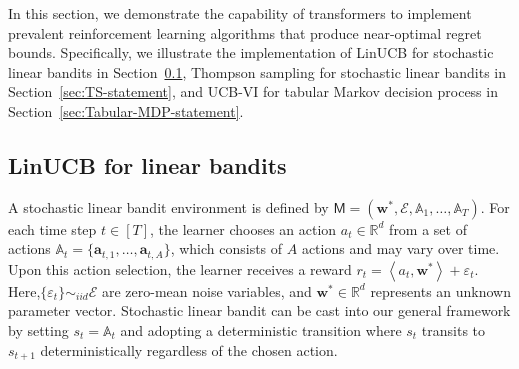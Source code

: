 \documentclass[10pt]{article}
\newcommand{\eps}{\varepsilon}
\renewcommand{\cO}{\mathcal{O}}
\newcommand{\<}{\left\langle}
\renewcommand{\>}{\right\rangle}
\newcommand{\R}{\mathbb{R}}
\newcommand{\inst}{{\mathsf{M}}}
\newcommand{\tcO}{{\tilde{\mathcal O}}}
\newcommand{\state}{{s}}
\newcommand{\action}{{a}}
\newcommand{\reward}{{r}}
\newcommand{\totlen}{{T}} %
\newcommand{\prior}{{\Lambda}}
\newcommand{\aset}{{\sA}}
\newcommand{\TrueLBPar}{{\bw^*}}
\newcommand{\Noise}{{\eps}}
\newcommand{\Noisedist}{{\mathcal{E}}}
\newcommand{\Numact}{{A}}
\newcommand{\conO}{{\mathrm{O}}}
\def\sA{{\mathbb{A}}}
\def\ba{{\mathbf a}}
\def\bw{{\mathbf w}}
\begin{document}
In this section, we demonstrate the capability of transformers to implement prevalent reinforcement learning algorithms that produce near-optimal regret bounds. Specifically, we illustrate the implementation of LinUCB for stochastic linear bandits in Section~\ref{sec:LinUCB-statement}, Thompson sampling for stochastic linear bandits in Section~\ref{sec:TS-statement}, and UCB-VI for tabular Markov decision process in Section~\ref{sec:Tabular-MDP-statement}. %

\subsection{LinUCB for linear bandits}\label{sec:LinUCB-statement}

A stochastic linear bandit environment is defined by $\inst=(\TrueLBPar,\Noisedist,\aset_1,\ldots,\aset_\totlen)$. For each time step $t\in[\totlen]$, the learner chooses an action $\action_t\in\R^{d}$ from a set of actions $\sA_t=\{\ba_{t,1},\ldots,\ba_{t,\Numact}\}$, which consists of $\Numact$ actions and may vary over time. Upon this action selection, the learner receives a reward $\reward_t=\<\action_t,\TrueLBPar\>+\Noise_t$. Here,$\{ \Noise_t \} \sim_{ iid} \Noisedist$ are zero-mean noise variables, and $\TrueLBPar\in\R^{d}$ represents an unknown parameter vector. Stochastic linear bandit can be cast into our general framework by setting $s_t = \aset_t$ and adopting a deterministic transition where $s_t$ transits to $s_{t+1}$ deterministically regardless of the chosen action. 



\end{document}
